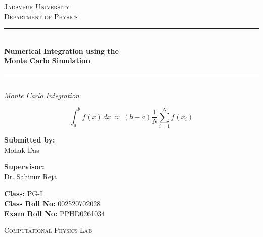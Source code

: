 \documentclass[12pt, a4paper, twoside]{article}
\begin{document}
    \begin{titlepage}
        \centering

        \vspace*{\fill}
        \Huge \textsc{\textcolor{navyblue}{Jadavpur University}}\\
        \LARGE \textsc{Department of Physics}\\[1cm]

        \textcolor{navyblue}{\rule{\linewidth}{0.8mm}} \\[0.4cm] 
        \Huge \textbf{\textcolor{navyblue}{Numerical Integration using the \\ Monte Carlo Simulation}} \\[0.2cm]
        \textcolor{navyblue}{\rule{\linewidth}{0.8mm}} \\[1.5cm] 

        \large \textit{Monte Carlo Integration}\\[0.5cm]

        \begin{tcolorbox}[colback=navyblue!5!white, colframe=navyblue, width=0.8\textwidth, boxrule=0.5mm, arc=2mm, auto outer arc]
            \centering \Large
            $$ \int_{a}^{b} f(x) \, dx ~\approx~ (b-a)\frac{1}{N}\sum_{i=1}^{N}f(x_i)$$
        \end{tcolorbox}

        \vspace{1.5cm}

        \noindent
        \begin{minipage}{0.4\textwidth}
            \begin{flushleft} \Large
                \textbf{Submitted by:}\\
                \textcolor{navyblue}{Mohak Das}\\
            \end{flushleft}
        \end{minipage}
        \begin{minipage}{0.4\textwidth}
            \begin{flushright} \Large
                \textbf{Supervisor:} \\
                Dr. Sahinur Reja\\
                \vspace{0.6cm}
            \end{flushright}
        \end{minipage}
        \vspace{1cm}

        \textbf{Class:} PG-I\\
        \textbf{Class Roll No:} 002520702028\\
        \textbf{Exam Roll No:} PPHD0261034
        \vspace{1.5cm}

        \textsc{Computational Physics Lab}

        \vspace*{\fill}


    \end{titlepage}
    \thispagestyle{empty}
\end{document}
